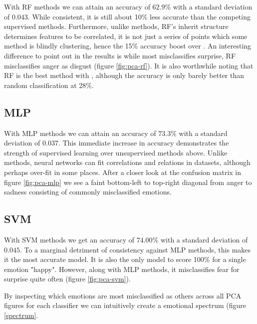 
With RF methods we can attain an accuracy of $62.9\%$ with a standard deviation of $0.043$. While consistent, it is still about 10\% less accurate than the competing supervised methods. Furthermore, unlike \knn methods, RF's inherit structure determines features to be correlated, it is not just a series of points which some method is blindly clustering, hence the 15\% accuracy boost over \knn. An interesting difference to point out in the results is while \knn most misclassifies surprise, RF misclassifies anger as disgust (figure \ref{fig:pca-rf}). It is also worthwhile noting that RF is the best method with \tsne, although the accuracy is only barely better than random classification at 28\%.

\subsection{MLP}


With MLP methods we can attain an accuracy of $73.3\%$ with a standard deviation of $0.037$. This immediate increase in accuracy demonstrates the strength of supervised learning over unsupervised methods above. Unlike \knn methods, neural networks can fit correlations and relations in datasets, although perhaps over-fit in some places. After a closer look at the confusion matrix in figure \ref{fig:pca-mlp} we see a faint bottom-left to top-right diagonal from anger to sadness consisting of commonly misclassified emotions.

\subsection{SVM}


With SVM methods we get an accuracy of $74.00\%$ with a standard deviation of $0.045$. To a marginal detriment of consistency against MLP methods, this makes it the most accurate model. It is also the only model to score 100\% for a single emotion "happy". However, along with MLP methods, it misclassifies fear for surprise quite often (figure \ref{fig:pca-svm}).

By inspecting which emotions are most misclassified as others across all PCA figures for each classifier we can intuitively create a emotional spectrum (figure \ref{spectrum}.

